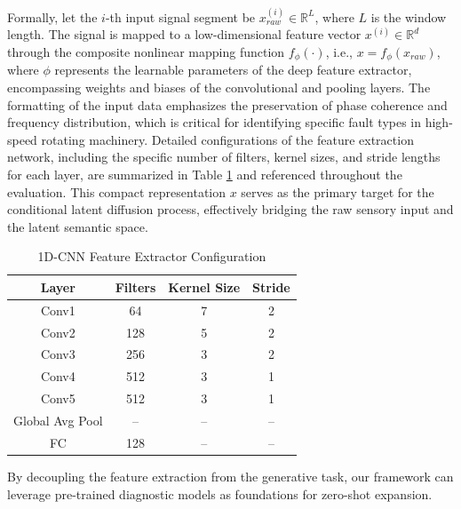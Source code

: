 \documentclass[journal]{IEEEtran}
\begin{document}
Formally, let the $i$-th input signal segment be $x_{raw}^{(i)} \in \mathbb{R}^L$, where $L$ is the window length. The signal is mapped to a low-dimensional feature vector $x^{(i)} \in \mathbb{R}^d$ through the composite nonlinear mapping function $f_{\phi}(\cdot)$, i.e., $x = f_{\phi}(x_{raw})$, where $\phi$ represents the learnable parameters of the deep feature extractor, encompassing weights and biases of the convolutional and pooling layers. The formatting of the input data emphasizes the preservation of phase coherence and frequency distribution, which is critical for identifying specific fault types in high-speed rotating machinery. Detailed configurations of the feature extraction network, including the specific number of filters, kernel sizes, and stride lengths for each layer, are summarized in Table \ref{tab:network} and referenced throughout the evaluation. This compact representation $x$ serves as the primary target for the conditional latent diffusion process, effectively bridging the raw sensory input and the latent semantic space.

\begin{table}[htbp]
\centering
\caption{1D-CNN Feature Extractor Configuration}
\label{tab:network}
\begin{tabular}{cccc}
\toprule
Layer & Filters & Kernel Size & Stride \\
\midrule
Conv1 & 64 & 7 & 2 \\
Conv2 & 128 & 5 & 2 \\
Conv3 & 256 & 3 & 2 \\
Conv4 & 512 & 3 & 1 \\
Conv5 & 512 & 3 & 1 \\
Global Avg Pool & -- & -- & -- \\
FC & 128 & -- & -- \\
\bottomrule
\end{tabular}
\end{table} By decoupling the feature extraction from the generative task, our framework can leverage pre-trained diagnostic models as foundations for zero-shot expansion.
\end{document}
